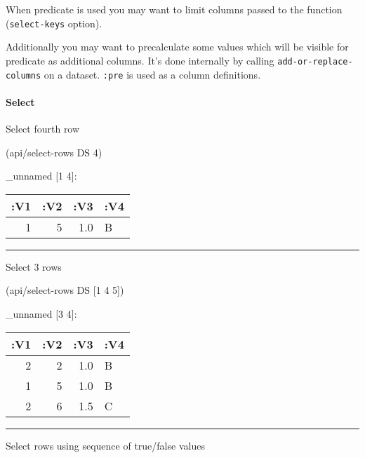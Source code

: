 \documentclass[]{article}
\newenvironment{Shaded}{\begin{snugshade}}{\end{snugshade}}
\newcommand{\DecValTok}[1]{\textcolor[rgb]{0.00,0.00,0.81}{#1}}
\newcommand{\NormalTok}[1]{#1}
\let\oldparagraph\paragraph
\renewcommand{\paragraph}[1]{\oldparagraph{#1}\mbox{}}
\begin{document}
When predicate is used you may want to limit columns passed to the
function (\texttt{select-keys} option).

Additionally you may want to precalculate some values which will be
visible for predicate as additional columns. It's done internally by
calling \texttt{add-or-replace-columns} on a dataset. \texttt{:pre} is
used as a column definitions.

\paragraph{Select}\label{select-1}

Select fourth row

\begin{Shaded}
\begin{Highlighting}[]
\NormalTok{(api/select-rows DS }\DecValTok{4}\NormalTok{)}
\end{Highlighting}
\end{Shaded}

\_unnamed {[}1 4{]}:

\begin{longtable}[]{@{}rrrl@{}}
\toprule
:V1 & :V2 & :V3 & :V4\tabularnewline
\midrule
\endhead
1 & 5 & 1.0 & B\tabularnewline
\bottomrule
\end{longtable}

\begin{center}\rule{0.5\linewidth}{0.5pt}\end{center}

Select 3 rows

\begin{Shaded}
\begin{Highlighting}[]
\NormalTok{(api/select-rows DS [}\DecValTok{1} \DecValTok{4} \DecValTok{5}\NormalTok{])}
\end{Highlighting}
\end{Shaded}

\_unnamed {[}3 4{]}:

\begin{longtable}[]{@{}rrrl@{}}
\toprule
:V1 & :V2 & :V3 & :V4\tabularnewline
\midrule
\endhead
2 & 2 & 1.0 & B\tabularnewline
1 & 5 & 1.0 & B\tabularnewline
2 & 6 & 1.5 & C\tabularnewline
\bottomrule
\end{longtable}

\begin{center}\rule{0.5\linewidth}{0.5pt}\end{center}

Select rows using sequence of true/false values
\end{document}
